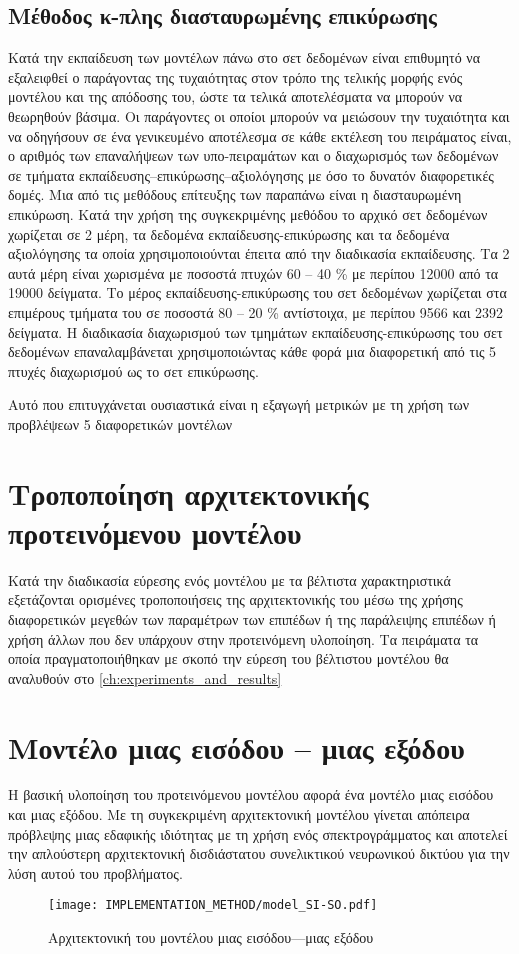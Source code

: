 \subsection{Μέθοδος κ-πλης διασταυρωμένης επικύρωσης}
Κατά την εκπαίδευση των μοντέλων πάνω στο σετ δεδομένων είναι επιθυμητό να εξαλειφθεί ο παράγοντας της τυχαιότητας στον τρόπο της τελικής μορφής ενός μοντέλου και της απόδοσης του, ώστε τα τελικά αποτελέσματα να μπορούν να θεωρηθούν βάσιμα.
Οι παράγοντες οι οποίοι μπορούν να μειώσουν την τυχαιότητα και να οδηγήσουν σε ένα γενικευμένο αποτέλεσμα σε κάθε εκτέλεση του πειράματος είναι, ο αριθμός των επαναλήψεων των υπο-πειραμάτων και ο διαχωρισμός των δεδομένων σε τμήματα εκπαίδευσης--επικύρωσης--αξιολόγησης με όσο το δυνατόν διαφορετικές δομές.
Μια από τις μεθόδους επίτευξης των παραπάνω είναι η διασταυρωμένη επικύρωση. Κατά την χρήση της συγκεκριμένης μεθόδου το αρχικό σετ δεδομένων χωρίζεται σε 2 μέρη, τα δεδομένα εκπαίδευσης-επικύρωσης και τα δεδομένα αξιολόγησης τα οποία χρησιμοποιούνται έπειτα από την διαδικασία εκπαίδευσης. Τα 2 αυτά μέρη είναι χωρισμένα με ποσοστά πτυχών 60 -- 40 \% με περίπου 12000 από τα 19000 δείγματα. Το μέρος εκπαίδευσης-επικύρωσης του σετ δεδομένων χωρίζεται στα επιμέρους τμήματα του σε ποσοστά 80 -- 20 \% αντίστοιχα, με περίπου 9566 και 2392 δείγματα.
Η διαδικασία διαχωρισμού των τμημάτων εκπαίδευσης-επικύρωσης του σετ δεδομένων επαναλαμβάνεται χρησιμοποιώντας κάθε φορά μια διαφορετική από τις 5 πτυχές διαχωρισμού ως το σετ επικύρωσης.

Αυτό που επιτυγχάνεται ουσιαστικά είναι η εξαγωγή μετρικών με τη χρήση των προβλέψεων 5 διαφορετικών μοντέλων

\section{Τροποποίηση αρχιτεκτονικής προτεινόμενου μοντέλου}
Κατά την διαδικασία εύρεσης ενός μοντέλου με τα βέλτιστα χαρακτηριστικά εξετάζονται ορισμένες τροποποιήσεις της αρχιτεκτονικής του μέσω της χρήσης διαφορετικών μεγεθών των παραμέτρων των επιπέδων ή της παράλειψης επιπέδων ή χρήση άλλων που δεν υπάρχουν στην προτεινόμενη υλοποίηση. Τα πειράματα τα οποία πραγματοποιήθηκαν με σκοπό την εύρεση του βέλτιστου μοντέλου θα αναλυθούν στο \ref{ch:experiments_and_results}

\section{Μοντέλο μιας εισόδου -- μιας εξόδου}
Η βασική υλοποίηση του προτεινόμενου μοντέλου αφορά ένα μοντέλο μιας εισόδου και μιας εξόδου. Με τη συγκεκριμένη αρχιτεκτονική μοντέλου γίνεται απόπειρα πρόβλεψης μιας εδαφικής ιδιότητας με τη χρήση ενός σπεκτρογράμματος και αποτελεί την απλούστερη αρχιτεκτονική δισδιάστατου συνελικτικού νευρωνικού δικτύου για την λύση αυτού του προβλήματος.
\begin{figure}[H]
  \begin{center}
    \texttt{[image: IMPLEMENTATION\_METHOD/model\_SI-SO.pdf]}
    \caption{Αρχιτεκτονική του μοντέλου μιας εισόδου---μιας εξόδου}
  \end{center}
\end{figure}
